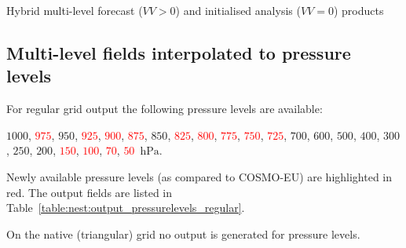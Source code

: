 \renewcommand{\onlyglb}[1]{}
\renewcommand{\onlyloc}[1]{#1}
%
\begin{vartable}{\caption{Hybrid multi-level forecast ($VV>0$) and initialised analysis ($VV=0$) products}}
  
  
  
\end{vartable}


\subsection{Multi-level fields interpolated to pressure levels}

\renewcommand{\new}[1]{\textcolor{red}{#1}}
%
%
\renewcommand{\pressurelevelsRegular}{$1000$, \new{$975$}, $950$, \new{$925$}, \new{$900$}, 
                                    \new{$875$}, $850$, \new{$825$}, \new{$800$}, 
                                    \new{$775$}, \new{$750$}, \new{$725$}, $700$, $600$, 
                                    $500$, $400$, $300$, $250$, $200$, \new{$150$}, \new{$100$}, 
                                    \new{$70$}, \new{$50$}~$\mathrm{hPa}$}

For regular grid output the following pressure levels are available: 
\begin{center}
\begin{minipage}{0.5\linewidth}
\pressurelevelsRegular. 
\end{minipage}
\end{center}

Newly available pressure levels (as compared to COSMO-EU) are highlighted in red. 
The output fields are listed in Table~\ref{table:nest:output_pressurelevels_regular}.

On the native (triangular) grid no output is generated for pressure levels.

\renewcommand{\new}[1]{#1}

